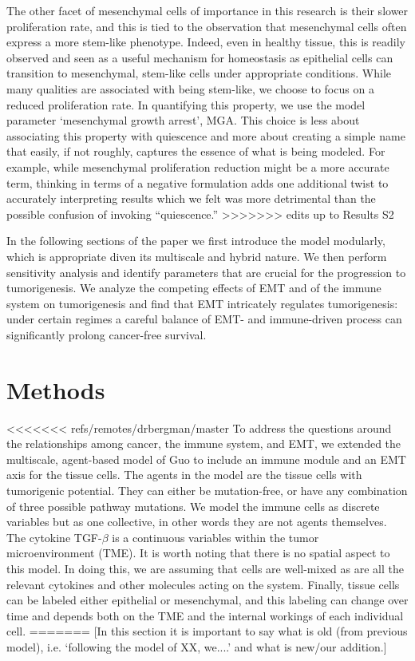 \documentclass{article}
\begin{document}
The other facet of mesenchymal cells of importance in this research is their slower proliferation rate, and this is tied to the observation that mesenchymal cells often express a more stem-like phenotype.
Indeed, even in healthy tissue, this is readily observed and seen as a useful mechanism for homeostasis as epithelial cells can transition to mesenchymal, stem-like cells under appropriate conditions.
While many qualities are associated with being stem-like, we choose to focus on a reduced proliferation rate.
In quantifying this property, we use the model parameter `mesenchymal growth arrest', MGA.
This choice is less about associating this property with quiescence and more about creating a simple name that easily, if not roughly, captures the essence of what is being modeled.
For example, while mesenchymal proliferation reduction might be a more accurate term, thinking in terms of a negative formulation adds one additional twist to accurately interpreting results which we felt was more detrimental than the possible confusion of invoking ``quiescence.''
>>>>>>> edits up to Results S2

In the following sections of the paper we first introduce the model modularly, which is appropriate diven its multiscale and hybrid nature. We then perform sensitivity analysis and identify parameters that are crucial for the progression to tumorigenesis. We analyze the competing effects of EMT and of the immune system on tumorigenesis and find that EMT intricately regulates tumorigenesis: under certain regimes a careful balance of EMT- and immune-driven process can significantly prolong cancer-free survival.   





\section{Methods}
<<<<<<< refs/remotes/drbergman/master
To address the questions around the relationships among cancer, the immune system, and EMT, we extended the multiscale, agent-based model of Guo to include an immune module and an EMT axis for the tissue cells.
The agents in the model are the tissue cells with tumorigenic potential.
They can either be mutation-free, or have any combination of three possible pathway mutations.
We model the immune cells as discrete variables but as one collective, in other words they are not agents themselves.
The cytokine TGF-$\beta$ is a continuous variables within the tumor microenvironment (TME).
It is worth noting that there is no spatial aspect to this model.
In doing this, we are assuming that cells are well-mixed as are all the relevant cytokines and other molecules acting on the system.
Finally, tissue cells can be labeled either epithelial or mesenchymal, and this labeling can change over time and depends both on the TME and the internal workings of each individual cell.
=======
[In this section it is important to say what is old (from previous model), i.e. `following the model of XX, we....' and what is new/our addition.]
\end{document}
